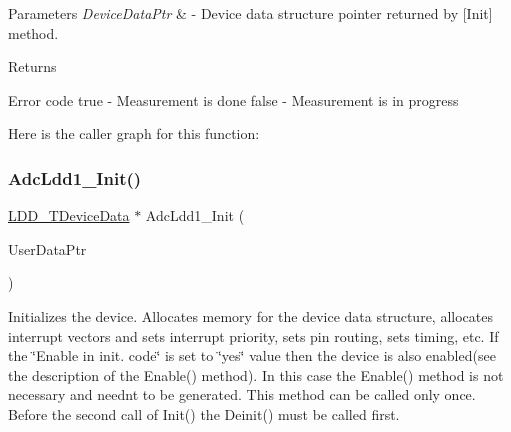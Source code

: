 \begin{DoxyParams}{Parameters}
{\em Device\+Data\+Ptr} & -\/ Device data structure pointer returned by \mbox{[}Init\mbox{]} method. \\
\hline
\end{DoxyParams}
\begin{DoxyReturn}{Returns}

\begin{DoxyItemize}
\item Error code true -\/ Measurement is done false -\/ Measurement is in progress 
\end{DoxyItemize}
\end{DoxyReturn}
Here is the caller graph for this function\+:
\mbox{\label{group___adc_ldd1__module_gafdc37e93f468b5be237479085546273f}} 
\subsubsection{\texorpdfstring{Adc\+Ldd1\+\_\+\+Init()}{AdcLdd1\_Init()}}
{\footnotesize\ttfamily \hyperlink{group___p_e___types__module_gac5cf1362f1f0e3a2ce71b1bf2276d091}{L\+D\+D\+\_\+\+T\+Device\+Data} $\ast$ Adc\+Ldd1\+\_\+\+Init (\begin{DoxyParamCaption}\item[{\hyperlink{group___p_e___types__module_ga0b66a73f87238a782318aa0be7578e35}{L\+D\+D\+\_\+\+T\+User\+Data} $\ast$}]{User\+Data\+Ptr }\end{DoxyParamCaption})}



Initializes the device. Allocates memory for the device data structure, allocates interrupt vectors and sets interrupt priority, sets pin routing, sets timing, etc. If the \char`\"{}\+Enable in init. code\char`\"{} is set to \char`\"{}yes\char`\"{} value then the device is also enabled(see the description of the Enable() method). In this case the Enable() method is not necessary and needn\textquotesingle{}t to be generated. This method can be called only once. Before the second call of Init() the Deinit() must be called first. 


